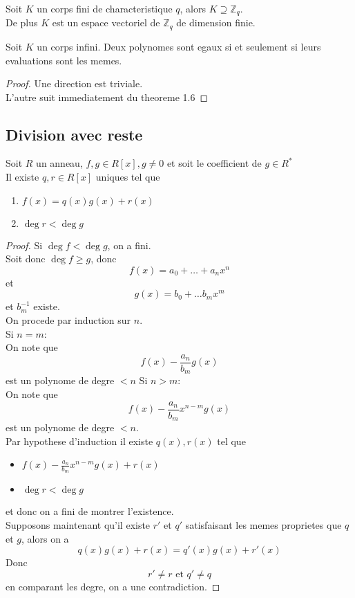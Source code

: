 \documentclass[../main.tex]{subfiles}
\begin{document}
\begin{thm}
	Soit $K$ un corps fini de characteristique $q$, alors $K \supseteq \mathbb{Z}_q$.\\
	De plus $K$ est un espace vectoriel de $\mathbb{Z}_q$ de dimension finie.\\
\end{thm}
\begin{crly}
Soit $K$ un corps infini. Deux polynomes sont egaux si et seulement si leurs evaluations sont les memes.
\end{crly}
\begin{proof}
Une direction est triviale.\\
L'autre suit immediatement du theoreme 1.6
\end{proof}
\subsection{Division avec reste}

\begin{thm}
	Soit $R$ un anneau, $f,g \in R[x], g\neq0$ et soit le coefficient de $g \in R^{*}$ \\
	Il existe $q,r \in R[x]$ uniques tel que
	\begin{enumerate}
		\item $f( x) =q( x) g( x) + r( x) $ 
		\item $\deg r < \deg g$
	\end{enumerate}
	
\end{thm}
\begin{proof}
	Si $\deg f < \deg g$, on a fini.\\
	Soit donc $\deg f \geq g$, donc
	\[ 
		f( x) = a_0 + \ldots + a_n x^{n}
	\]
	et 
	\[ 
		g( x) = b_0 + \ldots b_m x^{m}
	\]
	et $b_m^{-1}$ existe.\\
	On procede par induction sur $n$.\\
	Si $n=m$:\\
	On note que
	\[ 
		f( x) - \frac{a_n}{b_m} g( x) 
	\]
	est un polynome de degre $<n$ 
	Si $n>m$:\\
	On note que
	\[ 
		f( x) - \frac{a_n}{b_m}x^{n-m}g( x) 
	\]
	est un polynome de degre $<n$.\\
	Par hypothese d'induction il existe $q( x) ,r( x) $ tel que
	\begin{itemize}
		\item $f( x) - \frac{a_n}{b_m}x^{n-m}g( x) + r( x)  $
		\item $\deg r <\deg g$
	\end{itemize}
	et donc on a fini de montrer l'existence.\\
	Supposons maintenant qu'il existe $r'$ et $q'$ satisfaisant les memes proprietes que $q$ et $g$, alors on a
	\[ 
		q( x) g( x)  + r( x)  = q'( x) g( x) + r'( x) 
	\]
	Donc
	\[ 
	r' \neq r \text{ et  } q' \neq q
	\]
	en comparant les degre, on a une contradiction.
		
\end{proof}
\end{document}
